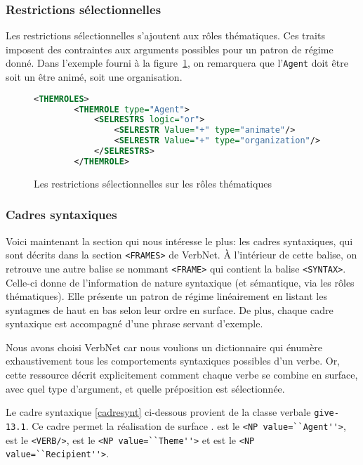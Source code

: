 \subsubsection{Restrictions sélectionnelles}
Les restrictions sélectionnelles s'ajoutent aux rôles thématiques. Ces traits imposent des contraintes aux arguments possibles pour un patron de régime donné. Dans l'exemple fourni à la figure~\ref{fig:restrictionsel}, on remarquera que l'\texttt{Agent} doit être soit un être animé, soit une organisation.

\begin{figure}[htb]
 \caption{Les restrictions sélectionnelles sur les rôles thématiques}
 \label{fig:restrictionsel}
\begin{lstlisting}[language=Xml]
    <THEMROLES>
        <THEMROLE type="Agent">
            <SELRESTRS logic="or">
                <SELRESTR Value="+" type="animate"/>
                <SELRESTR Value="+" type="organization"/>
            </SELRESTRS>
        </THEMROLE>
\end{lstlisting}
\end{figure}

\subsubsection{Cadres syntaxiques}

Voici maintenant la section qui nous intéresse le plus: les cadres syntaxiques, qui sont décrits dans la section \lstinline{<FRAMES>} de VerbNet. À l'intérieur de cette balise, on retrouve une autre balise se nommant \lstinline{<FRAME>} qui contient la balise \lstinline{<SYNTAX>}. Celle-ci donne de l'information de nature syntaxique (et sémantique, via les rôles thématiques). Elle présente un patron de régime linéairement en listant les syntagmes de haut en bas selon leur ordre en surface. De plus, chaque cadre syntaxique est accompagné d'une phrase servant d'exemple.

Nous avons choisi VerbNet car nous voulions un dictionnaire qui énumère exhaustivement tous les comportements syntaxiques possibles d'un verbe. Or, cette ressource décrit explicitement comment chaque verbe se combine en surface, avec quel type d'argument, et quelle préposition est sélectionnée.

Le cadre syntaxique \ref{cadresynt} ci-dessous provient de la classe verbale \texttt{give-13.1}. Ce cadre permet la réalisation de surface .  est le \lstinline{<NP value=``Agent''>},  est le \lstinline{<VERB/>},  est le \lstinline{<NP value=``Theme''>} et  est le \lstinline{<NP value=``Recipient''>}.

